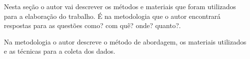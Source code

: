 Nesta seção o autor vai descrever os métodos e materiais que foram utilizados
para a elaboração do trabalho. É na metodologia que o autor encontrará
respostas para as questões como? com quê? onde? quanto?.

Na metodologia o autor descreve o método de abordagem, os materiais utilizados
e as técnicas para a coleta dos dados.

\textopadrao

\textopadrao
